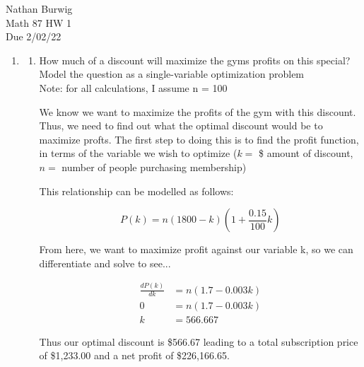 \documentclass[11pt]{article}
\begin{document}
\noindent Nathan Burwig \\
Math 87 HW 1 \\
Due 2/02/22 

\hrulefill



\begin{enumerate}


\item 
\begin{enumerate}
    \item How much of a discount will maximize the gyms profits on this special?
    Model the question as a single-variable optimization problem \\
    
    Note: for all calculations, I assume n = 100    
    
    We know we want to maximize the profits of the gym with this discount.
    Thus, we need to find out what the optimal discount would be to maximize
    profts. The first step to doing this is to find the profit function, in
    terms of the variable we wish to optimize ($k=$ \$ amount of discount,
    $n=$ number of people purchasing membership)
    
    This relationship can be modelled as follows:
    
    \begin{equation}
        \label{eqn:profit}
        P(k)=n\left( 1800 - k \right) \left(1 + \frac{0.15}{100}k \right)
    \end{equation}
    
    From here, we want to maximize profit against our variable k, so we can
    differentiate and solve to see...
    
    \begin{align*}
        \frac{dP(k)}{dk} &= n(1.7-0.003k)\\
        0 &= n(1.7-0.003k)\\
        k &= 566.667
    \end{align*}
    
    Thus our optimal discount is \$566.67 leading to a total subscription price of
    \$1,233.00 and a net profit of \$226,166.65.
    

\end{enumerate}
\end{enumerate}
\end{document}
